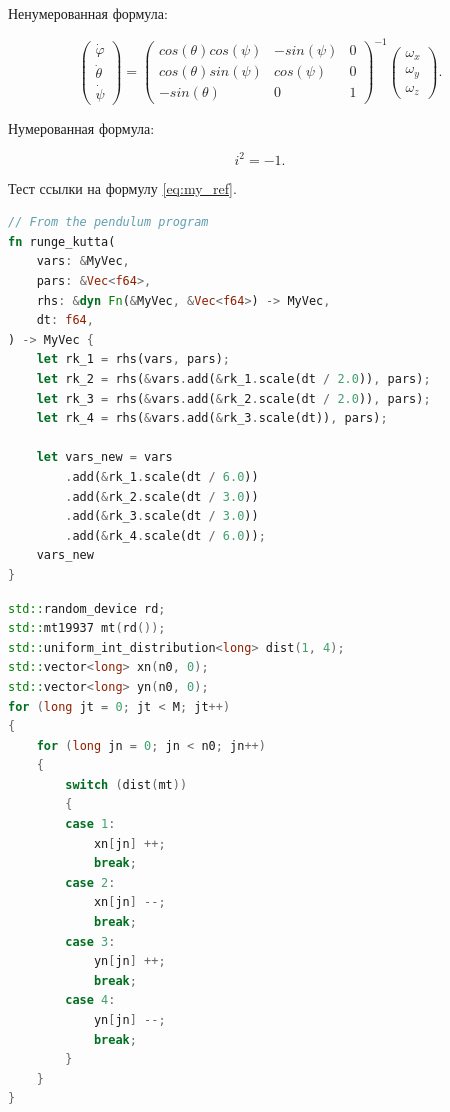 \documentclass[a4paper,14pt]{extarticle}
\begin{document}
Ненумерованная формула:

\begin{equation}
    \begin{pmatrix} \dot{\varphi}\\ \dot{\theta} \\ \dot{\psi} \end{pmatrix}
    = \begin{pmatrix}
        cos(\theta)cos(\psi) & -sin(\psi) & 0 \\
        cos(\theta)sin(\psi) & cos(\psi)  & 0 \\
        -sin(\theta)         & 0         &  1
    \end{pmatrix}^{-1}
    \begin{pmatrix} \omega_x\\ \omega_y \\ \omega_z \end{pmatrix}.
\end{equation}

Нумерованная формула:

\begin{equation}
    i^2 = -1.
    \label{eq:my_ref}
\end{equation}

Тест ссылки на формулу \ref{eq:my_ref}.

\begin{lstlisting}[language=rust,caption={Программная реализация метода Рунге-Кутты},label={listing-1}]
// From the pendulum program
fn runge_kutta(
    vars: &MyVec,
    pars: &Vec<f64>,
    rhs: &dyn Fn(&MyVec, &Vec<f64>) -> MyVec,
    dt: f64,
) -> MyVec {
    let rk_1 = rhs(vars, pars);
    let rk_2 = rhs(&vars.add(&rk_1.scale(dt / 2.0)), pars);
    let rk_3 = rhs(&vars.add(&rk_2.scale(dt / 2.0)), pars);
    let rk_4 = rhs(&vars.add(&rk_3.scale(dt)), pars);

    let vars_new = vars
        .add(&rk_1.scale(dt / 6.0))
        .add(&rk_2.scale(dt / 3.0))
        .add(&rk_3.scale(dt / 3.0))
        .add(&rk_4.scale(dt / 6.0));
    vars_new
}
\end{lstlisting}

\begin{lstlisting}[language=C++,caption={Подпрограмма случайного блуждания на плоскости},label={listing-2}]
std::random_device rd;
std::mt19937 mt(rd());
std::uniform_int_distribution<long> dist(1, 4);
std::vector<long> xn(n0, 0);
std::vector<long> yn(n0, 0);
for (long jt = 0; jt < M; jt++)
{
    for (long jn = 0; jn < n0; jn++)
    {
        switch (dist(mt))
        {
        case 1:
            xn[jn] ++;
            break;
        case 2:
            xn[jn] --;
            break;
        case 3:
            yn[jn] ++;
            break;
        case 4:
            yn[jn] --;
            break;
        }
    }
}
\end{lstlisting}
\end{document}
